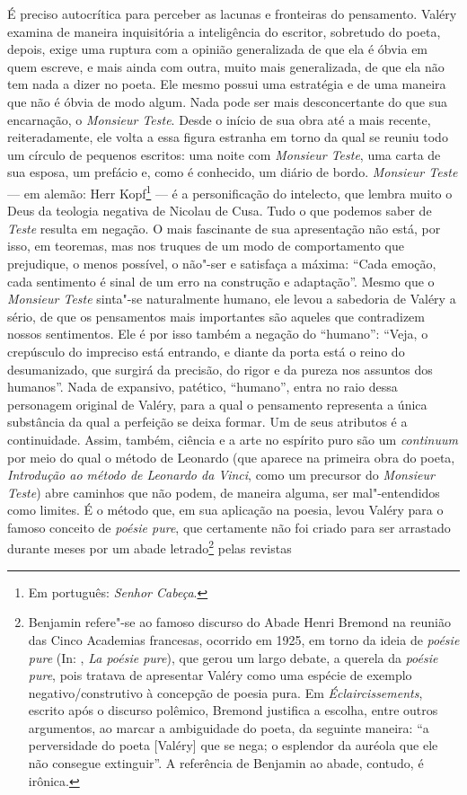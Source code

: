 É preciso autocrítica para perceber as lacunas e fronteiras do
pensamento. Valéry examina de maneira inquisitória a inteligência do
escritor, sobretudo do poeta, depois, exige uma ruptura com a opinião
generalizada de que ela é óbvia em quem escreve, e mais ainda com outra,
muito mais generalizada, de que ela não tem nada a dizer no poeta. Ele
mesmo possui uma estratégia e de uma maneira que não é óbvia de modo algum. Nada pode
ser mais desconcertante do que sua encarnação, o \emph{Monsieur Teste}.
Desde o início de sua obra até a mais recente, reiteradamente, ele volta
a essa figura estranha em torno da qual se reuniu todo um círculo de
pequenos escritos: uma noite com \emph{Monsieur Teste}, uma carta de sua
esposa, um prefácio e, como é conhecido, um diário de bordo. \emph{Monsieur
Teste} --- em alemão: Herr Kopf\footnote{Em português: \emph{Senhor
  Cabeça}. \versal{[N.~T.]}} --- é a personificação do intelecto, que lembra muito o Deus
da teologia negativa de Nicolau de Cusa. Tudo o que podemos
saber de \emph{Teste} resulta em negação. O mais fascinante de sua
apresentação não está, por isso, em teoremas, mas nos truques de um modo
de comportamento que prejudique, o menos possível, o não"-ser e satisfaça
a máxima: ``Cada emoção, cada sentimento é sinal de um erro na construção
e adaptação''. Mesmo que o \emph{Monsieur Teste} sinta"-se naturalmente humano,
ele levou a sabedoria de Valéry a sério, de que os pensamentos mais
importantes são aqueles que contradizem nossos sentimentos. Ele é por
isso também a negação do ``humano'': ``Veja, o crepúsculo do impreciso está
entrando, e diante da porta está o reino do desumanizado, que surgirá
da precisão, do rigor e da pureza nos assuntos dos humanos''. Nada de
expansivo, patético, ``humano'', entra no raio dessa personagem original
de Valéry, para a qual o pensamento representa a única substância da
qual a perfeição se deixa formar. Um de seus atributos é a continuidade.
Assim, também, ciência e a arte no espírito puro são um \emph{continuum}
por meio do qual o método de Leonardo (que aparece na primeira obra do
poeta, \emph{Introdução ao método de Leonardo da Vinci}, como um precursor do
\emph{Monsieur Teste}) abre caminhos que não podem, de maneira alguma, ser mal"-entendidos como limites. É o método que, em sua aplicação na poesia,
levou Valéry para o famoso conceito de \emph{poésie pure}, que
certamente não foi criado para ser arrastado durante meses por um abade
letrado\footnote{Benjamin refere"-se ao famoso discurso do Abade
  Henri Bremond na reunião das Cinco Academias francesas, ocorrido em
  1925, em torno da ideia de \emph{poésie pure} (In: , \emph{La
  poésie pure}), que gerou um largo debate, a querela da \emph{poésie
    pure}, pois tratava de apresentar Valéry como uma espécie de exemplo
  negativo/construtivo à concepção de poesia pura. Em
  \emph{Éclaircissements}, escrito após o discurso polêmico, Bremond
  justifica a escolha, entre outros argumentos, ao marcar a ambiguidade
  do poeta, da seguinte maneira: ``a perversidade do poeta {[}Valéry{]}
  que se nega; o esplendor da auréola que ele não consegue extinguir''.
  A referência de Benjamin ao abade, contudo, é irônica. \versal{[N.~O.]}} pelas revistas
